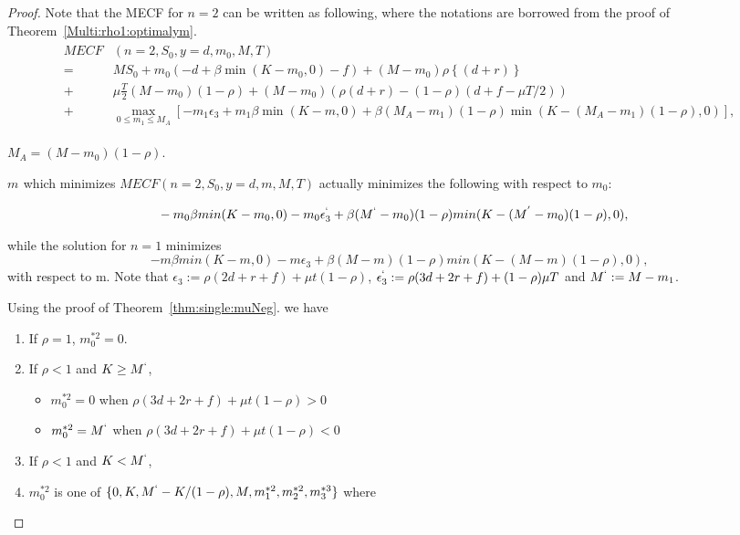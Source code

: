 \documentclass[11pt]{article}
\theoremstyle{plain}
\numberwithin{equation}{section}
\begin{document}
\begin{proof}
Note that the MECF for $n=2$ can be written as following, where the notations are borrowed from the proof of Theorem~\ref{Multi:rho1:optimalym}.
\begin{gather}
	\begin{aligned}
MECF &(n=2, S_0,y=d, m_0,M,T)\\
=&M S_0 +  m_0(-d+\beta \min (K-m_0,0)-f)
+(M-m_0)\rho \left\{ (d+r)\right\}\\
+&\mu \frac{T}{2}(M-m_0)(1-\rho) + (M-m_0)(\rho(d+r)-(1-\rho)(d+f-\mu T/2))\\
 + &\max_{0\leq {m_1}\leq M_A}[-{m_1}\epsilon_3 +{m_1}\beta \min (K-m,0)
	+\beta (M_A-{m_1})(1-\rho) \min(K-(M_A-{m_1})(1-\rho),0)],
\end{aligned}
\end{gather}

$M_A=(M-m_0)(1-\rho)$.

$m^{}$ which minimizes $MECF (n=2, S_0,y=d, m,M,T)$ actually minimizes the following with respect to $m_0$:

\begin{align}\nonumber
&-m_0 \beta min(K-m_0,0) -m_0 \epsilon_3^{`} + \beta (M^{`}-m_0 )(1-\rho) min (K- (M^{'}-m_0  )(1-\rho),0), \nonumber
\end{align}



while the solution for $n=1$ minimizes 
$$
-m \beta min(K-m,0) -m \epsilon_3 + \beta (M-m)(1-\rho) min (K- (M-m)(1-\rho),0),
$$
with respect to m. Note that $\epsilon_3:=\rho(2d+r+f)+\mu t(1-\rho)$, $\epsilon_3^{`}:=\rho(3d+2r+f)+(1-\rho)\mu T$ and $M^{`}:=M-m_1$.

Using the proof of Theorem~\ref{thm:single:muNeg}. we have 


\begin{enumerate}
	\item If $\rho=1$, $m_0^{*2}=0$.
	\item If $\rho<1$ and $K\geq M^{`}$,
		\begin{itemize}
			\item $m_0^{*2}=0$ when $\rho(3d+2r+f)+\mu t(1-\rho)>0$
			\item $m_0^{*2}=M^{`}$ when $\rho(3d+2r+f)+\mu t(1-\rho)<0$
		\end{itemize}
	\item If $\rho<1$ and $K< M^{`}$,	
	\item[] $m_0^{*2}$ is one of $\{0,K, M^{`}-K/(1-\rho), M, m^{*2}_1, m^{*2}_2, m^{*3}_3\}$ where  
\end{enumerate}


\end{proof}
\end{document}
